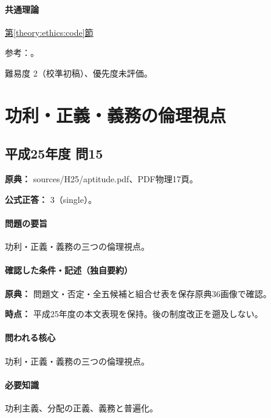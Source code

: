 \paragraph{共通理論} \hyperref[theory:ethics:code]{第\ref*{theory:ethics:code}節}

\par 参考：\cite{ipej_ethics2011}。

\par 難易度 2（校準初稿）、優先度未評価。

\section{功利・正義・義務の倫理視点}

\subsection{平成25年度 問15}
\label{q:h25-reg-apt-15}

\noindent\textbf{原典：} sources/H25/aptitude.pdf、PDF物理17頁。

\textbf{公式正答：} 3（single）。

\paragraph{問題の要旨} 功利・正義・義務の三つの倫理視点。

\paragraph{確認した条件・記述（独自要約）}\mbox{}\par

\noindent\textbf{原典：} 問題文・否定・全五候補と組合せ表を保存原典36画像で確認。\par

\noindent\textbf{時点：} 平成25年度の本文表現を保持。後の制度改正を遡及しない。\par

\paragraph{問われる核心} 功利・正義・義務の三つの倫理視点。

\paragraph{必要知識} 功利主義、分配の正義、義務と普遍化。


